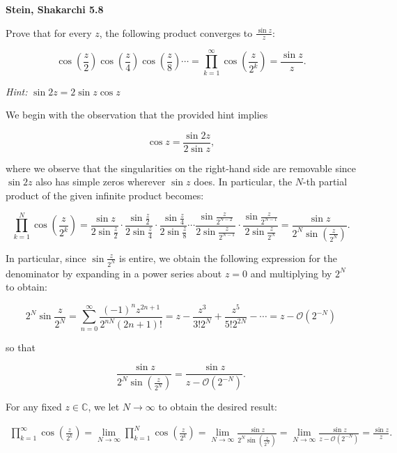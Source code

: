 \textbf{Stein, Shakarchi 5.8}

Prove that for every $z$, the following product converges to $\frac{\sin{z}}{z}$:

$$
\cos{\left(\frac{z}{2}\right)} \cos{\left(\frac{z}{4}\right)} \cos{\left(\frac{z}{8}\right)} \cdots 
  = \prod_{k=1}^{\infty} \cos{\left(\frac{z}{2^k}\right)}
  = \frac{\sin{z}}{z}.
$$

\textit{Hint: } $\sin{2z} = 2 \sin{z} \cos{z}$

\begin{solution}
  We begin with the observation that the provided hint implies

  $$
  \cos{z} = \frac{\sin{2z}}{2 \sin{z}},
  $$

  where we observe that the singularities on the right-hand side are removable since $\sin{2 z}$ also has simple zeros 
  wherever $\sin{z}$ does. In particular, the $N$-th partial product of the given infinite product becomes:

  $$
  \prod_{k=1}^{N} \cos{\left(\frac{z}{2^k}\right)} 
    = \frac{\sin{z}}{2 \sin{\frac{z}{2}}} 
      \cdot \frac{\sin{\frac{z}{2}}}{2 \sin{\frac{z}{4}}} 
      \cdot \frac{\sin{\frac{z}{4}}}{2 \sin{\frac{z}{8}}} 
      \cdots \frac{\sin{\frac{z}{2^{N-2}}}}{2 \sin{\frac{z}{2^{N-1}}}}
      \cdot \frac{\sin{\frac{z}{2^{N-1}}}}{2 \sin{\frac{z}{2^N}}}
    = \frac{\sin{z}}{2^N \sin{\left(\frac{z}{2^N}\right)}}.
  $$

  In particular, since $\sin{\frac{z}{2^N}}$ is entire, we obtain the following expression for the denominator by 
  expanding in a power series about $z = 0$ and multiplying by $2^N$ to obtain:

  $$
  2^N \sin{\frac{z}{2^N}} = \sum_{n=0}^{\infty} \frac{(-1)^n z^{2n+1}}{2^{nN} (2n+1)!}
                          = z - \frac{z^3}{3! 2^{N}} + \frac{z^5}{5! 2^{2N}} - \cdots
                          = z - \mathcal{O}\left(2^{-N}\right)
  $$

  so that 

  $$
    \frac{\sin{z}}{2^N \sin{\left(\frac{z}{2^N}\right)}} 
      = \frac{\sin{z}}{z - \mathcal{O} \left(2^{-N}\right)}.
  $$

  For any fixed $z \in \mathbb{C}$, we let $N \to \infty$ to obtain the desired result: 

  \begin{align*}
    \prod_{k=1}^{\infty} \cos{\left(\frac{z}{2^k}\right)}
      = \lim\limits_{N \to \infty} \prod_{k=1}^{N} \cos{\left(\frac{z}{2^k}\right)}
      = \lim\limits_{N \to \infty} \frac{\sin{z}}{2^N \sin{\left(\frac{z}{2^N}\right)}} 
      = \lim\limits_{N \to \infty} \frac{\sin{z}}{z - \mathcal{O} \left(2^{-N}\right)}
      = \frac{\sin{z}}{z}.
  \end{align*}
  \ \\
\end{solution}
